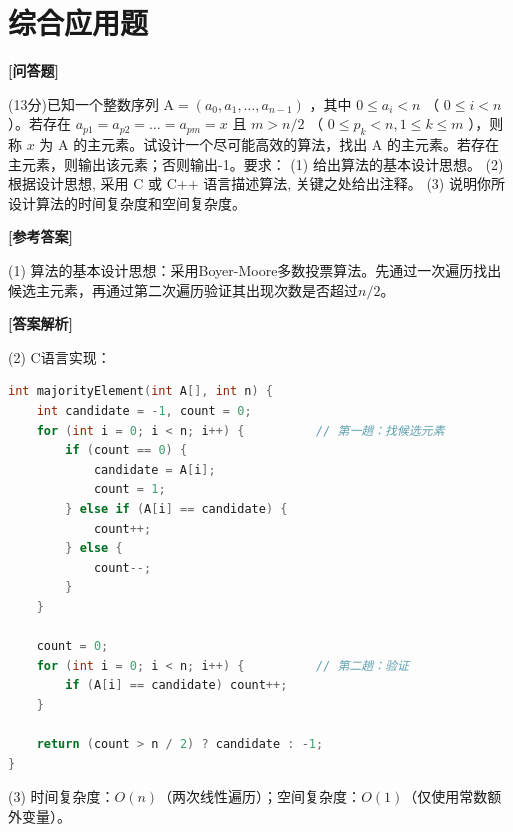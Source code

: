 \documentclass[12pt,a4paper]{article}
\newenvironment{choicequestion}[1][]{%
    \vspace{0.5cm}
    \noindent\textbf{[#1]}
    \vspace{0.2cm}
}{}
\newenvironment{answersection}{%
    \vspace{0.2cm}
    \noindent\textbf{[参考答案]}\\
    \vspace{0.1cm}
}{}
\newenvironment{analysissection}{%
    \vspace{0.2cm}
    \noindent\textbf{[答案解析]}\\
    \vspace{0.1cm}
}{}
\newcounter{questioncounter}
\newcounter{questioncounter}
\newcommand{\question}[2]{%
    \stepcounter{questioncounter}%
    \noindent\textbf{\thequestioncounter} #1%
}
\begin{document}
\section{综合应用题}

\begin{choicequestion}[问答题]
\question{(13分)已知一个整数序列 $\mathrm{A} = (a_{0}, a_{1}, \dots, a_{n - 1})$ ，其中 $0 \leqslant a_{i} < n$ （ $0 \leqslant i < n$ ）。若存在 $a_{p1} = a_{p2} = \dots = a_{pm} = x$ 且 $m > n / 2$ （ $0 \leqslant p_{k} < n, 1 \leqslant k \leqslant m$ ），则称 $x$ 为 A 的主元素。试设计一个尽可能高效的算法，找出 A 的主元素。若存在主元素，则输出该元素；否则输出-1。要求：\newline
(1) 给出算法的基本设计思想。  \newline
(2) 根据设计思想, 采用 C 或 C++ 语言描述算法, 关键之处给出注释。  \newline
(3) 说明你所设计算法的时间复杂度和空间复杂度。}{}

\begin{answersection}
(1) 算法的基本设计思想：采用Boyer-Moore多数投票算法。先通过一次遍历找出候选主元素，再通过第二次遍历验证其出现次数是否超过$n/2$。
\end{answersection}

\begin{analysissection}
(2) C语言实现：
\begin{lstlisting}[language=C]
int majorityElement(int A[], int n) {
    int candidate = -1, count = 0;
    for (int i = 0; i < n; i++) {          // 第一趟：找候选元素
        if (count == 0) {
            candidate = A[i];
            count = 1;
        } else if (A[i] == candidate) {
            count++;
        } else {
            count--;
        }
    }
    
    count = 0;
    for (int i = 0; i < n; i++) {          // 第二趟：验证
        if (A[i] == candidate) count++;
    }
    
    return (count > n / 2) ? candidate : -1;
}
\end{lstlisting}

(3) 时间复杂度：$O(n)$（两次线性遍历）；空间复杂度：$O(1)$（仅使用常数额外变量）。
\end{analysissection}
\end{choicequestion}
\end{document}
